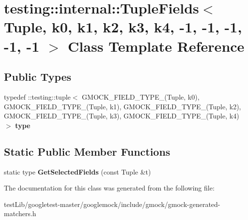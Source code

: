 \hypertarget{classtesting_1_1internal_1_1TupleFields_3_01Tuple_00_01k0_00_01k1_00_01k2_00_01k3_00_01k4_00_01-111caa1fee55a41736499c292bb1a612}{}\section{testing\+:\+:internal\+:\+:Tuple\+Fields$<$ Tuple, k0, k1, k2, k3, k4, -\/1, -\/1, -\/1, -\/1, -\/1 $>$ Class Template Reference}
\label{classtesting_1_1internal_1_1TupleFields_3_01Tuple_00_01k0_00_01k1_00_01k2_00_01k3_00_01k4_00_01-111caa1fee55a41736499c292bb1a612}
\subsection*{Public Types}
\begin{DoxyCompactItemize}
\item 
\mbox{\label{classtesting_1_1internal_1_1TupleFields_3_01Tuple_00_01k0_00_01k1_00_01k2_00_01k3_00_01k4_00_01-111caa1fee55a41736499c292bb1a612_a6522aa749b8a04f150b16a696a632740}} 
typedef \+::testing\+::tuple$<$ G\+M\+O\+C\+K\+\_\+\+F\+I\+E\+L\+D\+\_\+\+T\+Y\+P\+E\+\_\+(Tuple, k0), G\+M\+O\+C\+K\+\_\+\+F\+I\+E\+L\+D\+\_\+\+T\+Y\+P\+E\+\_\+(Tuple, k1), G\+M\+O\+C\+K\+\_\+\+F\+I\+E\+L\+D\+\_\+\+T\+Y\+P\+E\+\_\+(Tuple, k2), G\+M\+O\+C\+K\+\_\+\+F\+I\+E\+L\+D\+\_\+\+T\+Y\+P\+E\+\_\+(Tuple, k3), G\+M\+O\+C\+K\+\_\+\+F\+I\+E\+L\+D\+\_\+\+T\+Y\+P\+E\+\_\+(Tuple, k4)$>$ {\bfseries type}
\end{DoxyCompactItemize}
\subsection*{Static Public Member Functions}
\begin{DoxyCompactItemize}
\item 
\mbox{\label{classtesting_1_1internal_1_1TupleFields_3_01Tuple_00_01k0_00_01k1_00_01k2_00_01k3_00_01k4_00_01-111caa1fee55a41736499c292bb1a612_a41a82af79c1031009384d6bc18c14547}} 
static type {\bfseries Get\+Selected\+Fields} (const Tuple \&t)
\end{DoxyCompactItemize}


The documentation for this class was generated from the following file\+:\begin{DoxyCompactItemize}
\item 
test\+Lib/googletest-\/master/googlemock/include/gmock/gmock-\/generated-\/matchers.\+h\end{DoxyCompactItemize}
